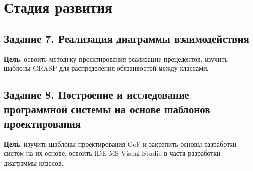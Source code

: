 \documentclass[a4paper, 14pt]{extarticle}
\begin{document}

\section{Стадия развития}

\subsection*{Задание 7. Реализация диаграммы взаимодействия}

\textbf{Цель}: освоить методику проектирования реализации прецедентов, изучить
шаблоны GRASP для распределения обязанностей между классами.


\subsection*{
  Задание 8. Построение и исследование программной системы на основе шаблонов
  проектирования
}

\textbf{Цель}: изучить шаблоны проектирования GoF и закрепить основы разработки
систем на их основе, освоить IDE MS Visual Studio в части разработки диаграммы
классов.

\end{document}
